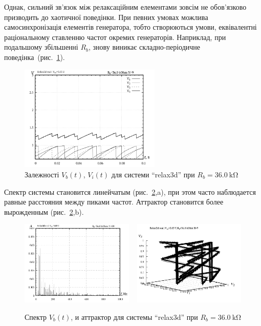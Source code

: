 Однак, сильний зв'язок між релаксаційним елементами зовсім не
обов'язково призводить до хаотичної поведінки. При певних
умовах можлива самосинхронізація елементів генератора, тобто
створюються умови, еквівалентні раціональному ставленню частот
окремих генераторів. Наприклад, при подальшому збільшенні
$R_b$, знову виникає складно-періодичне
поведінка~(рис.~\ref{atu:f:relax3d_t_09}).

\begin{figure}[htb!]
  \centerline{\includegraphics[width=0.6\textwidth]{p/relax3d_t_09.png} }
\caption{Залежності $ V_b (t) $, $ V_i (t) $ для системи ``relax3d'' при $ R_b = \SI{36.0}{\kilo\ohm} $}
\label{atu:f:relax3d_t_09}
\end{figure}

Спектр системы становится линейчатым (рис.~\ref{atu:f:relax3d_f_09},a), при этом
часто наблюдается равные расстояния между пиками частот.
Аттрактор становится более вырожденным (рис.~\ref{atu:f:relax3d_f_09},b).

\begin{figure}[htb!]
  \centerline{
    \includegraphics[width=0.48\textwidth]{p/relax3d_f_09.png}
    ~
    \includegraphics[width=0.48\textwidth]{p/relax3d_v1v2v3_09.png}
  }
  \caption{Спектр $V_b(t)$, и аттрактор для системы ``relax3d'' при $R_b=\SI{36.0}{\kilo\ohm}$ }
  \label{atu:f:relax3d_f_09}
\end{figure}

